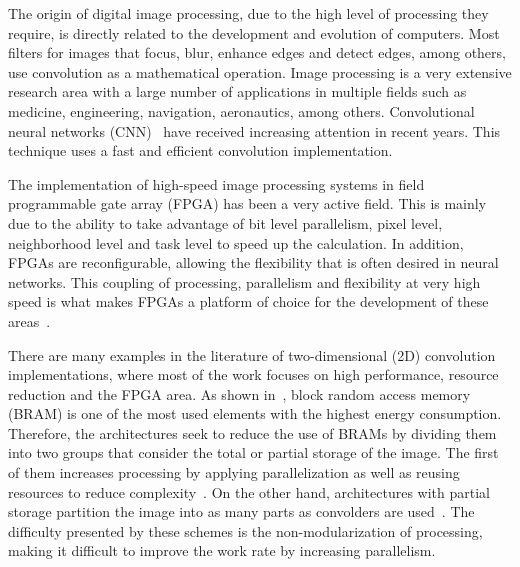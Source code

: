 \documentclass[conference,compsoc]{IEEEtran}
\begin{document}



The origin of digital image processing, due to the high level of processing they
require, is directly related to the development and evolution of computers. Most
filters for images that focus, blur, enhance edges and detect edges, among
others, use convolution as a mathematical operation. Image processing is a very
extensive research area with a large number of applications in multiple fields
such as medicine, engineering, navigation, aeronautics, among others.
Convolutional neural networks (CNN)~\cite{Lecun-et-al-1998} have received
increasing attention in recent years. This technique uses a fast and efficient
convolution implementation.

The implementation of high-speed image processing systems in field programmable
gate array (FPGA) has been a very active field. This is mainly due to the
ability to take advantage of bit level parallelism, pixel level, neighborhood
level and task level to speed up the calculation. In addition, FPGAs are
reconfigurable, allowing the flexibility that is often desired in neural
networks. This coupling of processing, parallelism and flexibility at very high
speed is what makes FPGAs a platform of choice for the development of these
areas~\cite{papercnn}.

There are many examples in the literature of two-dimensional (2D) convolution
implementations, where most of the work focuses on high performance, resource
reduction and the FPGA area. As shown in~\cite{paper3}, block random access
memory (BRAM) is one of the most used elements with the highest energy
consumption. Therefore, the architectures seek to reduce the use of BRAMs by
dividing them into two groups that consider the total or partial storage of the
image. The first of them increases processing by applying parallelization as
well as reusing resources to reduce complexity~\cite{paper1,paper5}. On the
other hand, architectures with partial storage partition the image into as many
parts as convolders are used~\cite{paper2,paper4}. The difficulty presented by
these schemes is the non-modularization of processing, making it difficult to
improve the work rate by increasing parallelism.
\end{document}
